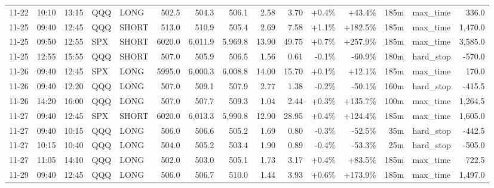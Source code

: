 \documentclass[11pt,a4paper,twoside]{article}
\begin{document}
\begin{landscape}
\begin{center}
\begin{longtable}{>{\color{txtmain}}l l l l l r r r r r r r r >{\color{txtmain}}l r}
11-22 & 10:10 & 13:15 & QQQ & LONG & 502.5 & 504.3 & 506.1 & 2.58 & 3.70 & \textcolor{wingreen}{+0.4\%} & \textcolor{wingreen}{+43.4\%} & 185m & max\_time & \textcolor{wingreen}{336.0} \\
11-25 & 09:40 & 12:45 & QQQ & SHORT & 513.0 & 510.9 & 505.4 & 2.69 & 7.58 & \textcolor{wingreen}{+1.1\%} & \textcolor{wingreen}{+182.5\%} & 185m & max\_time & \textcolor{wingreen}{1,470.0} \\
11-25 & 09:50 & 12:55 & SPX & SHORT & 6020.0 & 6,011.9 & 5,969.8 & 13.90 & 49.75 & \textcolor{wingreen}{+0.7\%} & \textcolor{wingreen}{+257.9\%} & 185m & max\_time & \textcolor{wingreen}{3,585.0} \\
11-25 & 12:55 & 15:55 & QQQ & SHORT & 507.0 & 505.9 & 506.5 & 1.56 & 0.61 & \textcolor{lossred}{-0.1\%} & \textcolor{lossred}{-60.9\%} & 180m & hard\_stop & \textcolor{lossred}{-570.0} \\
11-26 & 09:40 & 12:45 & SPX & LONG & 5995.0 & 6,000.3 & 6,008.8 & 14.00 & 15.70 & \textcolor{wingreen}{+0.1\%} & \textcolor{wingreen}{+12.1\%} & 185m & max\_time & \textcolor{wingreen}{170.0} \\
11-26 & 09:40 & 12:20 & QQQ & LONG & 507.0 & 509.1 & 507.9 & 2.77 & 1.38 & \textcolor{lossred}{-0.2\%} & \textcolor{lossred}{-50.1\%} & 160m & hard\_stop & \textcolor{lossred}{-415.5} \\
11-26 & 14:20 & 16:00 & QQQ & LONG & 507.0 & 507.7 & 509.3 & 1.04 & 2.44 & \textcolor{wingreen}{+0.3\%} & \textcolor{wingreen}{+135.7\%} & 100m & max\_time & \textcolor{wingreen}{1,264.5} \\
11-27 & 09:40 & 12:45 & SPX & SHORT & 6020.0 & 6,013.3 & 5,990.8 & 12.90 & 28.95 & \textcolor{wingreen}{+0.4\%} & \textcolor{wingreen}{+124.4\%} & 185m & max\_time & \textcolor{wingreen}{1,605.0} \\
11-27 & 09:40 & 10:15 & QQQ & LONG & 506.0 & 506.6 & 505.2 & 1.69 & 0.80 & \textcolor{lossred}{-0.3\%} & \textcolor{lossred}{-52.5\%} & 35m & hard\_stop & \textcolor{lossred}{-442.5} \\
11-27 & 10:15 & 10:40 & QQQ & LONG & 504.0 & 505.2 & 503.4 & 1.90 & 0.89 & \textcolor{lossred}{-0.4\%} & \textcolor{lossred}{-53.3\%} & 25m & hard\_stop & \textcolor{lossred}{-505.0} \\
11-27 & 11:05 & 14:10 & QQQ & LONG & 502.0 & 503.0 & 505.1 & 1.73 & 3.17 & \textcolor{wingreen}{+0.4\%} & \textcolor{wingreen}{+83.5\%} & 185m & max\_time & \textcolor{wingreen}{722.5} \\
11-29 & 09:40 & 12:45 & QQQ & LONG & 506.0 & 506.7 & 510.0 & 1.44 & 3.93 & \textcolor{wingreen}{+0.6\%} & \textcolor{wingreen}{+173.9\%} & 185m & max\_time & \textcolor{wingreen}{1,497.0} \\

\end{longtable}
\end{center}
\end{landscape}
\end{document}
